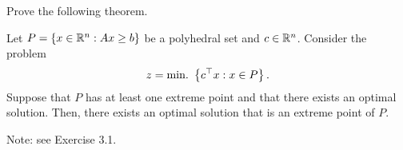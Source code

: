 
Prove the following theorem.

\begin{theorem*} 
	\small
	Let $P = \left\{ x \in \mathbb{R}^n : Ax \geq b \right \}$ be a polyhedral set and $c \in \mathbb{R}^n$. Consider the problem 
	\begin{equation*}
		z = \mathop{\text{min.~}}\left\{ c^\top x : x \in P \right \}.					
	\end{equation*}
	Suppose that $P$ has at least one extreme point and that there exists an optimal solution. Then, there exists an optimal solution that is an extreme point of $P$.
\end{theorem*}

Note: see Exercise 3.1.